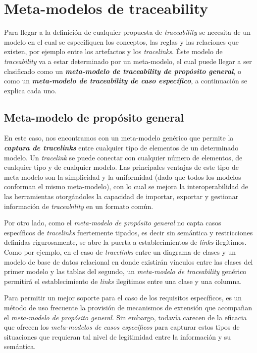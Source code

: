 \documentclass[a4paper,12pt,oneside,spanish]{book}
\begin{document}
\section{Meta-modelos de traceability}

Para llegar a la definición de cualquier propuesta de \textit{traceability} se necesita de un modelo en el cual se especifiquen los conceptos, las reglas y las relaciones que existen, por ejemplo entre los artefactos y los \textit{tracelinks}. Éste modelo de \textit{traceability} va a estar determinado por un meta-modelo, el cual puede llegar a ser clasificado como un \textit{\textbf{meta-modelo de traceability de propósito general}}, o como un \textit{\textbf{meta-modelo de traceability de caso específico}}, a continuación se explica cada uno.

\subsection{Meta-modelo de propósito general}
\label{subsec:MetaModeloPropositoGeneral}

En este caso, nos encontramos con un meta-modelo genérico que permite la \textit{\textbf{captura de tracelinks}} entre cualquier tipo de elementos de un determinado modelo. Un \textit{tracelink} se puede conectar con cualquier número de elementos, de cualquier tipo y de cualquier modelo. Las principales ventajas de este tipo de meta-modelo son la simplicidad y la uniformidad (dado que todos los modelos conforman el mismo meta-modelo), con lo cual se mejora la interoperabilidad de las herramientas otorgándoles la capacidad de importar, exportar y gestionar información de \textit{traceability} en un formato común.

Por otro lado, como el \textit{meta-modelo de propósito general} no capta casos específicos de \textit{tracelinks} fuertemente tipados, es decir sin semántica y restricciones definidas rigurosamente, se abre la puerta a establecimientos de \textit{links} ilegítimos. Como por ejemplo, en el caso de \textit{tracelinks} entre un diagrama de clases y un modelo de base de datos relacional en donde existirán vínculos entre las clases del primer modelo y las tablas del segundo, un \textit{meta-modelo de traceability} genérico permitirá el establecimiento de \textit{links} ilegítimos entre una clase y una columna.

Para permitir un mejor soporte para el caso de los requisitos específicos, es un método de uso frecuente la provisión de mecanismos de extensión que acompañan el \textit{meta-modelo de propósito general}. Sin embargo, todavía carecen de la eficacia que ofrecen los \textit{meta-modelos de casos específicos} para capturar estos tipos de situaciones que requieran tal nivel de legitimidad entre la información y su semántica.
\end{document}
